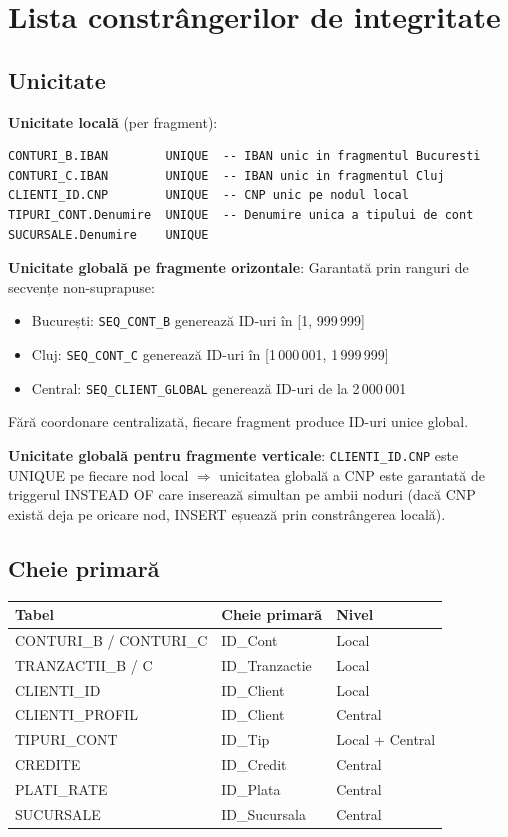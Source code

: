 \documentclass[12pt,a4paper]{article}
\begin{document}
\section{Lista constrângerilor de integritate}

\subsection{Unicitate}

\textbf{Unicitate locală} (per fragment):
\begin{lstlisting}[caption={Constrângeri UNIQUE locale}]
CONTURI_B.IBAN        UNIQUE  -- IBAN unic in fragmentul Bucuresti
CONTURI_C.IBAN        UNIQUE  -- IBAN unic in fragmentul Cluj
CLIENTI_ID.CNP        UNIQUE  -- CNP unic pe nodul local
TIPURI_CONT.Denumire  UNIQUE  -- Denumire unica a tipului de cont
SUCURSALE.Denumire    UNIQUE
\end{lstlisting}

\textbf{Unicitate globală pe fragmente orizontale}:
Garantată prin ranguri de secvențe non-suprapuse:
\begin{itemize}
  \item București: \texttt{SEQ\_CONT\_B} generează ID-uri în [1, 999\,999]
  \item Cluj: \texttt{SEQ\_CONT\_C} generează ID-uri în [1\,000\,001, 1\,999\,999]
  \item Central: \texttt{SEQ\_CLIENT\_GLOBAL} generează ID-uri de la 2\,000\,001
\end{itemize}
Fără coordonare centralizată, fiecare fragment produce ID-uri unice global.

\textbf{Unicitate globală pentru fragmente verticale}:
\texttt{CLIENTI\_ID.CNP} este UNIQUE pe fiecare nod local $\Rightarrow$ unicitatea globală a CNP
este garantată de triggerul INSTEAD OF care inserează simultan pe ambii noduri
(dacă CNP există deja pe oricare nod, INSERT eșuează prin constrângerea locală).

\subsection{Cheie primară}

\begin{center}
\begin{tabular}{lll}
\toprule
\textbf{Tabel} & \textbf{Cheie primară} & \textbf{Nivel} \\
\midrule
CONTURI\_B / CONTURI\_C & ID\_Cont & Local \\
TRANZACTII\_B / C & ID\_Tranzactie & Local \\
CLIENTI\_ID & ID\_Client & Local \\
CLIENTI\_PROFIL & ID\_Client & Central \\
TIPURI\_CONT & ID\_Tip & Local + Central \\
CREDITE & ID\_Credit & Central \\
PLATI\_RATE & ID\_Plata & Central \\
SUCURSALE & ID\_Sucursala & Central \\
\bottomrule
\end{tabular}
\end{center}
\end{document}
